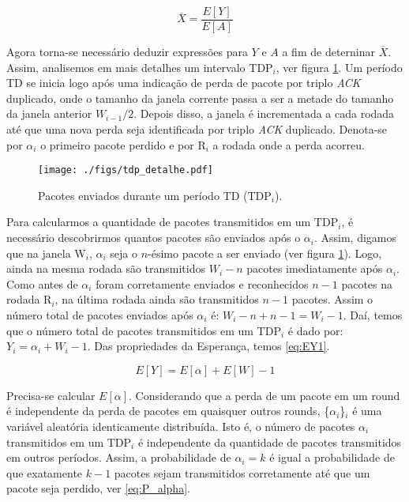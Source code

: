 \begin{equation} \label{eq:throughput}
\overline{X}=\frac{E[Y]}{E[A]}
\end{equation}

Agora torna-se necessário deduzir expressões para $Y$ e $A$ a fim de deterninar $\overline{X}$. Assim, 
analisemos em mais detalhes um intervalo TDP$_i$, ver figura \ref{fig:tdp_detalhe}.
Um período TD se inicia logo após uma indicação de perda de pacote por triplo \textit{ACK} duplicado, 
onde o tamanho da janela corrente passa a ser a metade do tamanho da janela anterior $W_{i-1} / 2$. 
Depois disso, a janela é incrementada a cada rodada até que uma nova perda seja identificada por triplo 
\textit{ACK} duplicado. Denota-se por $\alpha_i$ o primeiro pacote perdido e por R$_i$ a rodada onde a 
perda acorreu. 

\begin{figure}[ht]
  \centering
  \texttt{[image: ./figs/tdp\_detalhe.pdf]}
  \caption{Pacotes enviados durante um período TD (TDP$_{i}$).}
  \label{fig:tdp_detalhe}
\end{figure}

Para calcularmos a quantidade de pacotes transmitidos em um TDP$_i$, é necessário descobrirmos quantos pacotes
são enviados após o $\alpha_i$. Assim, digamos que na janela W$_i$, $\alpha_i$ seja o $n$-ésimo pacote a ser
enviado (ver figura \ref{fig:tdp_detalhe}). Logo, ainda na mesma rodada  são transmitidos $W_i - n$ pacotes 
imediatamente após $\alpha_i$. Como antes de $\alpha_i$ foram corretamente enviados e reconhecidos $n - 1$ pacotes 
na rodada R$_i$, na última rodada ainda são transmitidos $n - 1$ pacotes. Assim o número total de pacotes enviados
após $\alpha_i$ é: $W_i - n + n -1 = W_i - 1$. Daí, temos que o número total de pacotes transmitidos em um
TDP$_i$ é dado por: $Y_i = \alpha_i + W_i - 1$. Das propriedades da Esperança, temos \eqref{eq:EY1}.

\begin{equation} \label{eq:EY1}
E[Y]=E[\alpha] + E[W] - 1
\end{equation}

Precisa-se calcular $E[\alpha]$. Considerando que a perda de um pacote em um round é independente da perda de 
pacotes em quaisquer outros rounds, \{$\alpha_i$\}$_i$ é uma variável aleatória identicamente distribuída. 
Isto é, o número de pacotes $\alpha_i$ transmitidos em um TDP$_i$ é independente da quantidade de pacotes
transmitidos em outros períodos. Assim, a probabilidade de $\alpha_i = k$ é igual a probabilidade de que
exatamente $k - 1$ pacotes sejam transmitidos corretamente até que um pacote seja perdido, ver 
\eqref{eq:P_alpha}.

